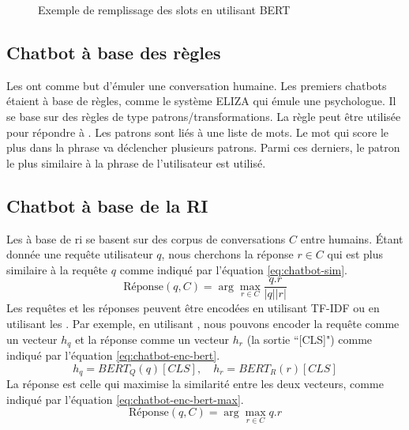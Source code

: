 \documentclass{KodeBook}
\begin{document}
\begin{figure}[!ht]
	\centering
	\caption[Exemple de remplissage des slots en utilisant BERT]{Exemple de remplissage des slots en utilisant BERT \cite{2020-jurafsky-martin}}
	\label{fig:sd-tache-remp-bert}
\end{figure}

\subsection{Chatbot à base des règles}

Les  ont comme but d'émuler une conversation humaine. 
Les premiers chatbots étaient à base de règles, comme le système ELIZA \cite{1966-Weizenbaum} qui émule une psychologue. 
Il se base sur des règles de type patrons/transformations. 
La règle  peut être utilisée pour répondre à . 
Les patrons sont liés à une liste de mots. 
Le mot qui score le plus dans la phrase va déclencher plusieurs patrons. 
Parmi ces derniers, le patron le plus similaire à la phrase de l'utilisateur est utilisé.

\subsection{Chatbot à base de la RI}

Les  à base de \ac{ri} se basent sur des corpus de conversations $C$ entre humains. 
Étant donnée une requête utilisateur $q$, nous cherchons la réponse $r \in C$ qui est plus similaire à la requête $q$ comme indiqué par l'équation \ref{eq:chatbot-sim}.
\begin{equation}\label{eq:chatbot-sim}
\text{Réponse}(q, C) = \arg\max_{r \in C} \frac{q . r}{|q| |r|}
\end{equation}
Les requêtes et les réponses peuvent être encodées en utilisant TF-IDF ou en utilisant les .
Par exemple, en utilisant , nous pouvons encoder la requête comme un vecteur $h_q$ et la réponse comme un vecteur $h_r$ (la sortie ``[CLS]") comme indiqué par l'équation \ref{eq:chatbot-enc-bert}.
\begin{equation}\label{eq:chatbot-enc-bert}
h_q = BERT_Q(q)[CLS],\quad h_r = BERT_R(r)[CLS]
\end{equation} 
La réponse est celle qui maximise la similarité entre les deux vecteurs, comme indiqué par l'équation \ref{eq:chatbot-enc-bert-max}.
\begin{equation}\label{eq:chatbot-enc-bert-max}
\text{Réponse}(q, C) = \arg\max_{r \in C} q . r
\end{equation}
\end{document}
